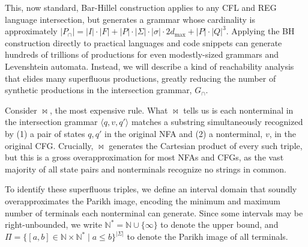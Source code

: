 \documentclass[runningheads]{llncs}
\begin{document}
  \vspace{2pt}

  This, now standard, Bar-Hillel construction applies to any CFL and REG language intersection, but generates a grammar whose cardinality is approximately $|P_\cap|=|I|\cdot|F| + |P|\cdot|\Sigma|\cdot|\sigma|\cdot2d_{\max} + |P|\cdot|Q|^3$. Applying the BH construction directly to practical languages and code snippets can generate hundreds of trillions of productions for even modestly-sized grammars and Levenshtein automata. Instead, we will describe a kind of reachability analysis that elides many superfluous productions, greatly reducing the number of synthetic productions in the intersection grammar, $G_\cap$.

  Consider $\Join$, the most expensive rule. What $\Join$ tells us is each nonterminal in the intersection grammar $\langle q, v, q'\rangle$ matches a substring simultaneously recognized by (1) a pair of states $q, q'$ in the original NFA and (2) a nonterminal, $v$, in the original CFG. Crucially, $\Join$ generates the Cartesian product of every such triple, but this is a gross overapproximation for most NFAs and CFGs, as the vast majority of all state pairs and nonterminals recognize no strings in common.

  To identify these superfluous triples, we define an interval domain that soundly overapproximates the Parikh image, encoding the minimum and maximum number of terminals each nonterminal can generate. Since some intervals may be right-unbounded, we write $\mathbb{N}^*=\mathbb{N} \cup \{\infty\}$ to denote the upper bound, and $\Pi = \{[a, b] \in \mathbb{N} \times \mathbb{N}^* \mid a \leq b\}^{|\Sigma|}$ to denote the Parikh image of all terminals.
\end{document}

